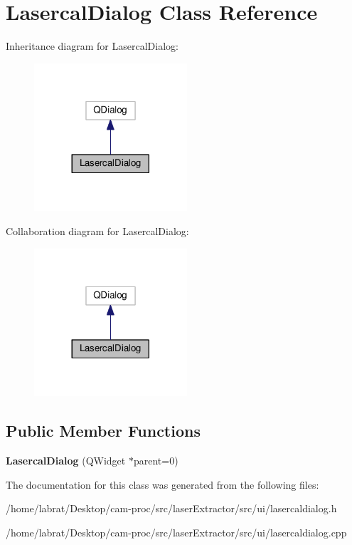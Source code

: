 \hypertarget{classLasercalDialog}{}\section{Lasercal\+Dialog Class Reference}
\label{classLasercalDialog}


Inheritance diagram for Lasercal\+Dialog\+:\nopagebreak
\begin{figure}[H]
\begin{center}
\leavevmode
\includegraphics[width=161pt]{classLasercalDialog__inherit__graph}
\end{center}
\end{figure}


Collaboration diagram for Lasercal\+Dialog\+:\nopagebreak
\begin{figure}[H]
\begin{center}
\leavevmode
\includegraphics[width=161pt]{classLasercalDialog__coll__graph}
\end{center}
\end{figure}
\subsection*{Public Member Functions}
\begin{DoxyCompactItemize}
\item 
{\bfseries Lasercal\+Dialog} (Q\+Widget $\ast$parent=0)\hypertarget{classLasercalDialog_ae4613b4e67fad23d4eccf3c6d0c5ee1e}{}\label{classLasercalDialog_ae4613b4e67fad23d4eccf3c6d0c5ee1e}

\end{DoxyCompactItemize}


The documentation for this class was generated from the following files\+:\begin{DoxyCompactItemize}
\item 
/home/labrat/\+Desktop/cam-\/proc/src/laser\+Extractor/src/ui/lasercaldialog.\+h\item 
/home/labrat/\+Desktop/cam-\/proc/src/laser\+Extractor/src/ui/lasercaldialog.\+cpp\end{DoxyCompactItemize}
